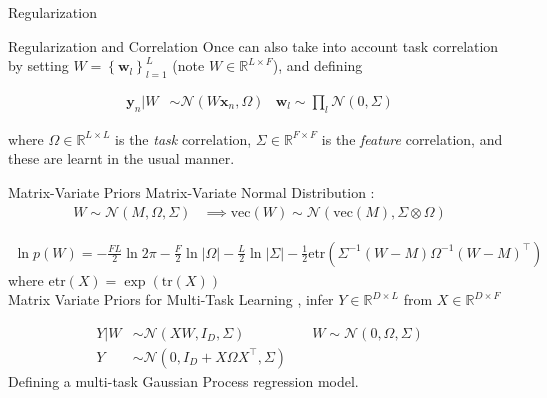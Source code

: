 \documentclass[xcolor=dvipsnames]{beamer}
\newcommand \vecf[1] {
    \text{vec}\left(#1\right)
}
\newcommand \halve[1] {
	\frac{#1}{2}
}
\newcommand \half {
    \halve{1}
}
\newcommand \tr { \text{tr} }
\newcommand \T { ^\top }
\newcommand \vv[1] { \boldsymbol #1 }
\newcommand \nor[2]   { \mathcal{N} \left( {#1}, {#2} \right) }
\newcommand \mnor[3]  { \mathcal{N} \left(#1, #2, #3\right) }
\newcommand \Tr[1]   { \tr \left(  {#1}  \right) }
\newcommand \MReal[2] { { \mathbb{R}^{#1 \times #2} } }
\newcommand \inv[1] { {#1}^{-1} }
\begin{document}
\begin{frame}{Regularization}

\end{frame}



\begin{frame}{Regularization and Correlation}
Once can also take into account task correlation by setting $W = \left\{ \vv{w}_l \right\}_{l=1}^L$ (note $W \in \MReal{L}{F}$), and defining

\begin{align*}
    \vv{y}_n|W & \sim \nor{W\vv{x}_n}{\Omega} & \vv{w}_l \sim \prod_l \nor{0}{\Sigma}
\end{align*}

where $\Omega \in \MReal{L}{L}$ is the \emph{task} correlation, $\Sigma \in \MReal{F}{F}$ is the \emph{feature} correlation, and these are learnt in the usual manner.


\end{frame}


\begin{frame}{Matrix-Variate Priors}
Matrix-Variate Normal Distribution \cite{Gupta1999} :
\begin{align*}
W \sim \mnor{M}{\Omega}{\Sigma} & \implies \vecf{W} \sim \nor{\vecf{M}}{\Sigma \otimes \Omega}
\end{align*}

{ \fontsize{9}{11}\selectfont
\begin{align*}
\ln p(W) = -\halve{FL} \ln 2\pi - \halve{F}\ln |\Omega| - \halve{L} \ln | \Sigma | - \half \text{etr} \left( \inv{\Sigma} (W - M) \inv{\Omega} (W - M)\T \right)
\end{align*}
}
where $\text{etr}(X) = \exp \left( \Tr{X} \right)$\\

\bigskip
\pause
Matrix Variate Priors for Multi-Task Learning\cite{Bonilla2008}\cite{Archambeau2011}
, infer $Y \in \MReal{D}{L}$ from $X \in \MReal{D}{F}$

\begin{align*}
Y | W & \sim \mnor{XW}{I_D}{\Sigma} & \quad W \sim \mnor{0}{\Omega}{\Sigma} \\
Y &\sim \mnor{0}{I_D + X \Omega X\T}{\Sigma}
\end{align*}
Defining a multi-task Gaussian Process regression model\cite{Bonilla2008}.

\end{frame}
\end{document}
